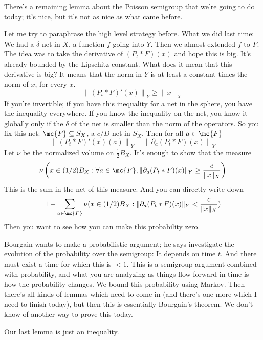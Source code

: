 
There's a remaining lemma about the Poisson semigroup that we're going to do today; it's nice, but it's not as nice as what came before. 

Let me try to paraphrase the high level strategy before. What we did last time: We had a $\delta$-net in $X$, a function $f$ going into $Y$. Then we almost extended $f$ to $F$. The idea was to take the derivative of $(P_t * F)(x)$ and hope this is big. It's already bounded by the Lipschitz constant. What does it mean that this derivative is big? It means that the norm in $Y$ is at least a constant times the norm of $x$, for every $x$. 
\[
\left\|(P_t * F)'(x)\right\|_Y \ge \|x\|_X
\]
If you're invertible; if you have this inequality for a net in the sphere, you have the inequality everywhere. If you know the inequality on the net, you know it globally only if the $\delta$ of the net is smaller than the norm of the operators. So you fix this net: $\mc{F} \subseteq S_X$, a $c/D$-net in $S_X$.  
Then for all $a \in \mc{F}$
\[
\left\|(P_t * F)'(x)(a)\right\|_Y = \left\| \partial_a(P_t * F)(x)\right\|_Y
\]
Let $\nu$ be the normalized volume on $\frac{1}{2}B_X$. It's enough to show that the measure 
\[
\nu\left(x \in (1/2)B_X: \forall a \in \mc{F}, \|\partial_a(P_t*F)(x)\|_Y \ge \frac{c}{\|x\|_X}\right)
\]
This is the sum in the net of this measure. 
And you can directly write down 
\[
1 - \sum_{a \in \mc{F}} \nu(x \in (1/2)B_X: \|\partial_a(P_t*F)(x)\|_Y < \frac{c}{\|x\|_X})
\]
Then you want to see how you can make this probability zero. 

Bourgain wants to make a probabilistic argument; he says investigate the evolution of the probability over the semigroup: It depends on time $t$. And there must exist a time for which this is $< 1$. This is a semigroup argument combined with probability, and what you are analyzing as things flow forward in time is how the probability changes. We bound this probability using Markov. Then there's all kinds of lemmas which need to come in (and there's one more which I need to finish today), but then this is essentially Bourgain's theorem. We don't know of another way to prove this today. 

Our last lemma is just an inequality. 

